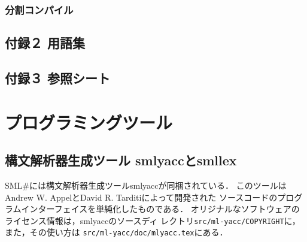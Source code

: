 \documentclass{jbook}
\newif\ifjp
\newcommand{\txt}[2]{#1}
\newcommand{\smlsharp}{SML\#}
\newcommand{\code}[1]{\mbox{\large\tt #1}}
\begin{document}
\section{\txt{分割コンパイル}{Separate compilation}}
\ifjp%
\else%
\fi%

% 
\chapter{\txt{付録２ 用語集}{Appendix 2 Glossary }}
\ifjp%
\else%
\fi%

% 
\chapter{\txt{付録３ 参照シート}{Appendix 3 \smlsharp{} Reference Card}}
\ifjp%
\else%
\fi%

% 
% 
\part{\txt{プログラミングツール}{Programming Tools}}
\label{part:tools}

\ifjp%
\else%
\fi%


\chapter{\txt{構文解析器生成ツール smlyaccとsmllex}{Parser generator smlacc and smllex}}
\ifjp%
	\smlsharp{}には構文解析器生成ツールsmlyaccが同梱されている．
	このツールはAndrew W. AppelとDavid R. Tarditiによって開発された
ソースコードのプログラムインターフェイスを単純化したものである．
	オリジナルなソフトウェアのライセンス情報は，smlyaccのソースディ
レクトリ\code{src/ml-yacc/COPYRIGHT}に，また，その使い方は
\code{src/ml-yacc/doc/mlyacc.tex}にある．
\end{document}
